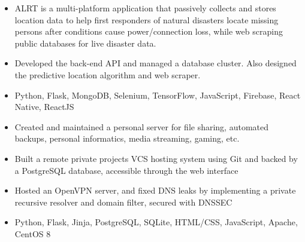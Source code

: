 \documentclass[11pt,letterpaper]{article}
\begin{document}
  \ifalrt
    {\fontsize{12}{12}}

    \begin{itemize}
      \item{ALRT is a multi-platform application that passively collects and stores location data to help first responders of natural disasters locate missing persons after conditions cause power/connection loss, while web scraping public databases for live disaster data.}

      \item{Developed the back-end API and managed a database cluster. Also designed the predictive location algorithm and web scraper.}

      \item{
        {}
        Python, Flask, MongoDB, Selenium, TensorFlow, JavaScript, Firebase, React Native, ReactJS
      }
    \end{itemize}
  \fi

  \iffirestorm
    {\fontsize{12}{12}}

    \begin{itemize}
      \item{Created and maintained a personal server for file sharing, automated backups, personal informatics, media streaming, gaming, etc.}

      \item{Built a remote private projects VCS hosting system using Git and backed by a PostgreSQL database, accessible through the web interface}

      \item{Hosted an OpenVPN server, and fixed DNS leaks by implementing a private recursive resolver and domain filter, secured with DNSSEC}

      \item{
        {}
        Python, Flask, Jinja, PostgreSQL, SQLite, HTML/CSS, JavaScript, Apache, CentOS 8
      }
    \end{itemize}
  \fi

  \ifkalistorm
    {\fontsize{12}{12}}
\end{document}
